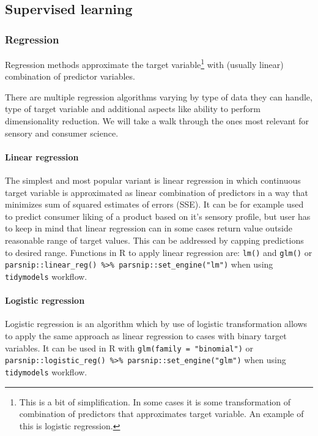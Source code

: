 \documentclass[
]{book}
\begin{document}
\hypertarget{supervised-learning}{%
\subsection{Supervised learning}\label{supervised-learning}}

\hypertarget{regression}{%
\subsubsection{Regression}\label{regression}}

Regression methods approximate the target variable\footnote{This is a bit of simplification.
  In some cases it is some transformation of combination of predictors that
  approximates target variable. An example of this is logistic regression.}
with (usually linear) combination of predictor variables.

There are multiple regression algorithms varying by type of data they can handle,
type of target variable and additional aspects like ability to perform
dimensionality reduction. We will take a walk through the ones most relevant for
sensory and consumer science.

\hypertarget{linear-regression}{%
\paragraph{Linear regression}\label{linear-regression}}

The simplest and most popular variant is linear regression in which continuous
target variable is approximated as linear combination of predictors in a way that
minimizes sum of squared estimates of errors (SSE). It can be for example used to
predict consumer liking of a product based on it's sensory profile, but user has
to keep in mind that linear regression can in some cases return value outside
reasonable range of target values. This can be addressed by capping predictions
to desired range. Functions in R to apply linear regression are: \texttt{lm()} and \texttt{glm()}
or \texttt{parsnip::linear\_reg()\ \%\textgreater{}\%\ parsnip::set\_engine("lm")} when using \texttt{tidymodels} workflow.

\hypertarget{logistic-regression}{%
\paragraph{Logistic regression}\label{logistic-regression}}

Logistic regression is an algorithm which by use of logistic transformation allows
to apply the same approach as linear regression to cases with binary target variables.
It can be used in R with \texttt{glm(family\ =\ "binomial")} or
\texttt{parsnip::logistic\_reg()\ \%\textgreater{}\%\ parsnip::set\_engine("glm")} when using \texttt{tidymodels} workflow.
\end{document}
